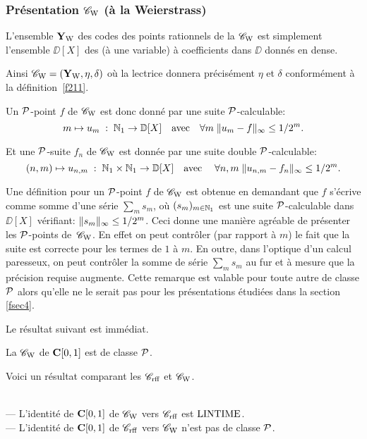 \subsubsection{Présentation  \texorpdfstring{${{{\mathscr C}}_{\rm W}}$}{Cw}
 (à la Weierstrass)}\label{fsubsubsec511}
L'ensemble  ${{\bf Y}_{\rm W}}$ des codes des points rationnels   de la \pres  ${{{\mathscr C}}_{\rm W}}$  est simplement l'ensemble  $\DD[X]$  des \pols (à une variable) à coefficients dans  $\DD$   donnés en \pres dense.

\smallskip Ainsi ${{{\mathscr C}}_{\rm W}}=({{\bf Y}_{\rm W}},\eta,\delta)$ où la lectrice donnera précisément $\eta$ et $\delta$ conformément à la définition~\ref{f211}.


\smallskip Un  ${\cal P}$-point $f$ de  ${{{\mathscr C}}_{\rm W}}$  est donc donné par une suite ${\cal P}$-calculable:  
\[
m \mapsto u_m \; : \; \mathbb {N}_1 \rightarrow \mathbb {D}[X] \quad \hbox{avec} \quad 
\forall m \; \lVert  u_m - f  \rVert_{\infty} \leq 1/2^m.
\]

Et une  ${\cal P}$-suite  $f_n$ de  ${{{\mathscr C}}_{\rm W}}$  est donnée par une suite double  ${\cal P}$-calculable: 
\[
(n,m) \mapsto u_{n,m} \; : \; \mathbb {N}_1 \times \mathbb {N}_1 \rightarrow \mathbb {D}[X] \quad \hbox{avec} \quad \; \forall n,m \; \lVert  u_{n,m} - f_n  \rVert_{\infty} 
\leq 1/2^m.
\]

\begin{fremark} \label{f511}
Une définition \equiva pour un ${\cal P}$-point $f$ de  ${{{\mathscr C}}_{\rm W}}$  est obtenue en 
demandant que $f$ s'écrive comme somme d'une série $\sum_m s_m$,
  où  $(s_m)_{m\in\mathbb {N}_1}$  est une suite  ${\cal P}$-calculable dans~$\DD[X]$   vérifiant:  
$\lVert s_m \rVert_{\infty} \leq 1/2^m$.  Ceci donne une manière 
agréable de présenter les  ${\cal P}$-points de~${{{\mathscr C}}_{\rm W}}$. 
En effet on peut contrôler \etpo (par rapport à  $m$)  le fait que la suite est correcte pour les termes de $1$ à  $m$.  
En outre, dans l'optique d'un calcul paresseux, on peut contrôler la somme de série $\sum_m s_m$ au fur et à mesure que la précision requise augmente. 
Cette remarque est valable pour toute autre \rp  de classe  ${\cal P}$  alors qu'elle ne le serait pas pour les présentations étudiées dans la section \ref{fsec4}.
\end{fremark}

\smallskip Le résultat suivant est immédiat.

\begin{fproposition} \label{f512}
La \pres  ${{{\mathscr C}}_{\rm W}}$  de  ${{\bf C}[0,1]}$  est de classe  ${\cal P}$.
\end{fproposition}


Voici un résultat comparant les \rps   ${{{\mathscr C}}_{\rm rff}}$  et ${{{\mathscr C}}_{\rm W}}$.  


\begin{fproposition} \label{f513}~\\
--- L'identité de  ${{\bf C}[0,1]}$  de  ${{{\mathscr C}}_{\rm W}}$  vers  ${{{\mathscr C}}_{\rm rff}}$  est  ${\rm LINTIME} $.\\
--- L'identité de  ${{\bf C}[0,1]}$  de  ${{{\mathscr C}}_{\rm rff}}$  vers  ${{{\mathscr C}}_{\rm W}}$  n'est pas de classe  ${\cal P}$.
\end{fproposition}

